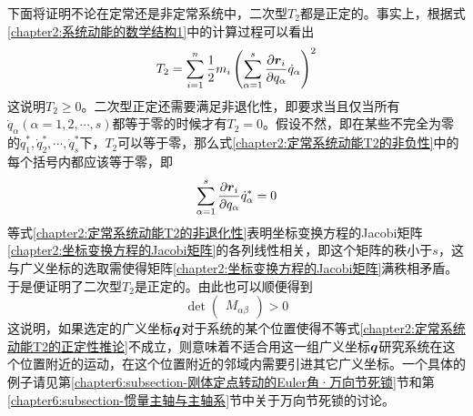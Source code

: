 下面将证明不论在定常还是非定常系统中，二次型$T_2$都是正定的。事实上，根据式\eqref{chapter2:系统动能的数学结构1}中的计算过程可以看出
\begin{equation}
	T_2 = \sum_{i=1}^n \frac12 m_i\left(\sum_{\alpha=1}^s \frac{\partial \boldsymbol{r}_i}{\partial q_\alpha} \dot{q}_\alpha\right)^2
	\label{chapter2:定常系统动能T2的非负性}
\end{equation}
这说明$T_2\geqslant 0$。二次型正定还需要满足非退化性，即要求当且仅当所有$\dot{q}_\alpha(\alpha=1,2,\cdots,s)$都等于零的时候才有$T_2=0$。假设不然，即在某些不完全为零的$\dot{q}_1^*,\dot{q}_2^*,\cdots,\dot{q}_s^*$下，$T_2$可以等于零，那么式\eqref{chapter2:定常系统动能T2的非负性}中的每个括号内都应该等于零，即
\begin{equation}
	\sum_{\alpha=1}^s\frac{\partial \boldsymbol{r}_i}{\partial q_\alpha}\dot{q}_\alpha^* = 0
	\label{chapter2:定常系统动能T2的非退化性}
\end{equation}
等式\eqref{chapter2:定常系统动能T2的非退化性}表明坐标变换方程的Jacobi矩阵\eqref{chapter2:坐标变换方程的Jacobi矩阵}的各列线性相关，即这个矩阵的秩小于$s$，这与广义坐标的选取需使得矩阵\eqref{chapter2:坐标变换方程的Jacobi矩阵}满秩相矛盾。于是便证明了二次型$T_2$是正定的。由此也可以顺便得到
\begin{equation}
	\det\begin{pmatrix} M_{\alpha\beta} \end{pmatrix} > 0
	\label{chapter2:定常系统动能T2的正定性推论}
\end{equation}
这说明，如果选定的广义坐标$\boldsymbol{q}$对于系统的某个位置使得不等式\eqref{chapter2:定常系统动能T2的正定性推论}不成立，则意味着不适合用这一组广义坐标$\boldsymbol{q}$研究系统在这个位置附近的运动，在这个位置附近的邻域内需要引进其它广义坐标。一个具体的例子请见第\ref{chapter6:subsection-刚体定点转动的Euler角·万向节死锁}节和第\ref{chapter6:subsection-惯量主轴与主轴系}节中关于万向节死锁的讨论。

